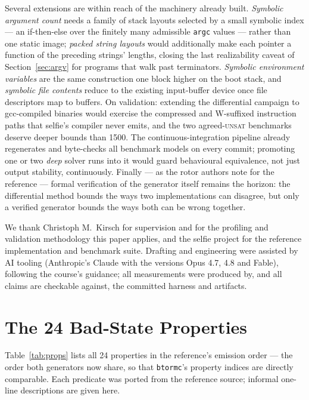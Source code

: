 \documentclass[sigplan,screen,nonacm]{acmart}
\begin{document}
Several extensions are within reach of the machinery already built.
\emph{Symbolic argument count} needs a family of stack layouts selected
by a small symbolic index --- an if-then-else over the finitely many
admissible \texttt{argc} values --- rather than one static image;
\emph{packed string layouts} would additionally make each pointer a
function of the preceding strings' lengths, closing the last
realizability caveat of Section~\ref{sec:argv} for programs that walk
past terminators. \emph{Symbolic environment variables} are the same
construction one block higher on the boot stack, and \emph{symbolic
file contents} reduce to the existing input-buffer device once file
descriptors map to buffers. On validation: extending the differential
campaign to gcc-compiled binaries would exercise the compressed and
W-suffixed instruction paths that selfie's compiler never emits, and
the two agreed-\textsc{unsat} benchmarks deserve deeper bounds than
1500. The continuous-integration pipeline already regenerates and
byte-checks all benchmark models on every commit; promoting one or two
\emph{deep} solver runs into it would guard behavioural equivalence,
not just output stability, continuously. Finally --- as the rotor
authors note for the reference --- formal verification of the
generator itself remains the horizon: the differential method bounds
the ways two implementations can disagree, but only a verified
generator bounds the ways both can be wrong together.

\begin{acks}

We thank Christoph M.\ Kirsch for supervision and for the profiling and
validation methodology this paper applies, and the selfie project for
the reference implementation and benchmark suite. Drafting and
engineering were assisted by AI tooling (Anthropic's Claude with the
versions Opus 4.7, 4.8 and Fable), following the course's guidance;
all measurements were produced by, and all claims are checkable
against, the committed harness and artifacts.
\end{acks}

\appendix

\section{The 24 Bad-State Properties}
\label{app:properties}

Table~\ref{tab:props} lists all 24 properties in the reference's
emission order --- the order both generators now share, so that
\texttt{btormc}'s property indices are directly comparable. Each
predicate was ported from the reference source; informal one-line
descriptions are given here.
\end{document}
